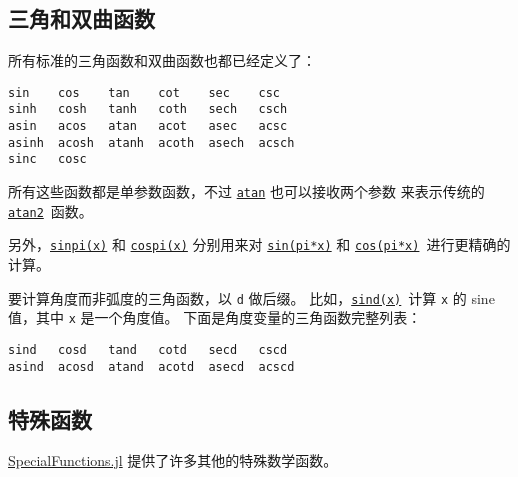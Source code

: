 \hypertarget{16706884854236336909}{}


\subsection{三角和双曲函数}



所有标准的三角函数和双曲函数也都已经定义了：




\begin{lstlisting}
sin    cos    tan    cot    sec    csc
sinh   cosh   tanh   coth   sech   csch
asin   acos   atan   acot   asec   acsc
asinh  acosh  atanh  acoth  asech  acsch
sinc   cosc
\end{lstlisting}



所有这些函数都是单参数函数，不过 \hyperlink{16445804261034090556}{\texttt{atan}} 也可以接收两个参数 来表示传统的 \href{https://en.wikipedia.org/wiki/Atan2}{\texttt{atan2}} 函数。



另外，\hyperlink{16554510911661822298}{\texttt{sinpi(x)}} 和 \hyperlink{2974547424856180253}{\texttt{cospi(x)}} 分别用来对 \hyperlink{10540279982054240733}{\texttt{sin(pi*x)}} 和 \hyperlink{10355926621556840804}{\texttt{cos(pi*x)}} 进行更精确的计算。



要计算角度而非弧度的三角函数，以 \texttt{d} 做后缀。 比如，\hyperlink{38337471195460170}{\texttt{sind(x)}} 计算 \texttt{x} 的 sine 值，其中 \texttt{x} 是一个角度值。 下面是角度变量的三角函数完整列表：




\begin{lstlisting}
sind   cosd   tand   cotd   secd   cscd
asind  acosd  atand  acotd  asecd  acscd
\end{lstlisting}



\hypertarget{17986622034630654775}{}


\subsection{特殊函数}



\href{https://github.com/JuliaMath/SpecialFunctions.jl}{SpecialFunctions.jl} 提供了许多其他的特殊数学函数。



\hypertarget{9739813100592614250}{}


